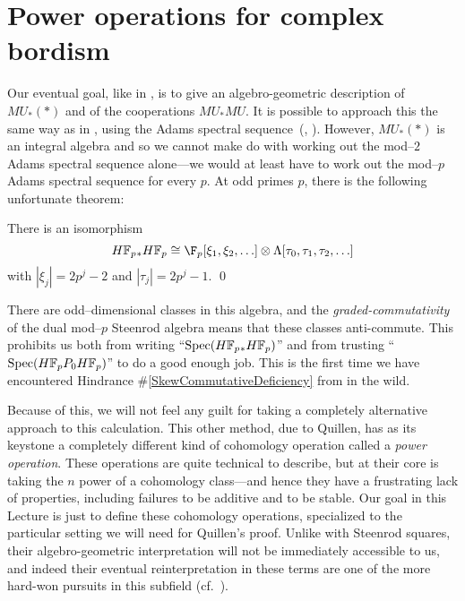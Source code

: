 \section{Power operations for complex bordism}\label{QuillenPowerOpnsSection}

Our eventual goal, like in , is to give an algebro-geometric description of $MU_*(*)$ and of the cooperations $MU_* MU$.  It is possible to approach this the same way as in , using the Adams spectral sequence~(\cite[Theorem 2]{QuillenAdamsSS}, \cite[Lecture 9]{LurieChromaticCourseNotes}).  However, $MU_*(*)$ is an integral algebra and so we cannot make do with working out the mod--$2$ Adams spectral sequence alone---we would at least have to work out the mod--$p$ Adams spectral sequence for every $p$.  At odd primes $p$, there is the following unfortunate theorem:
\begin{theorem}
There is an isomorphism
\[\HFp_* \HFp \cong \F_p[\xi_1, \xi_2, \ldots] \otimes \Lambda[\tau_0, \tau_1, \tau_2, \ldots]\]
with $|\xi_j| = 2p^j-2$ and $|\tau_j| = 2p^j - 1$. \qed
\end{theorem}
\noindent There are odd--dimensional classes in this algebra, and the \emph{graded-commutativity} of the dual mod--$p$ Steenrod algebra means that these classes anti-commute.  This prohibits us both from writing ``$\Spec(\HFp_* \HFp)$'' and from trusting ``$\Spec(\HFp P_0 \HFp)$'' to do a good enough job.  This is the first time we have encountered Hindrance \#\ref{SkewCommutativeDeficiency} from  in the wild.

Because of this, we will not feel any guilt for taking a completely alternative approach to this calculation.  This other method, due to Quillen, has as its keystone a completely different kind of cohomology operation called a \textit{power operation}.  These operations are quite technical to describe, but at their core is taking the $n${\th} power of a cohomology class---and hence they have a frustrating lack of properties, including failures to be additive and to be stable.  Our goal in this Lecture is just to define these cohomology operations, specialized to the particular setting we will need for Quillen's proof.  Unlike with Steenrod squares, their algebro-geometric interpretation will not be immediately accessible to us, and indeed their eventual reinterpretation in these terms are one of the more hard-won pursuits in this subfield (cf.\ ).

